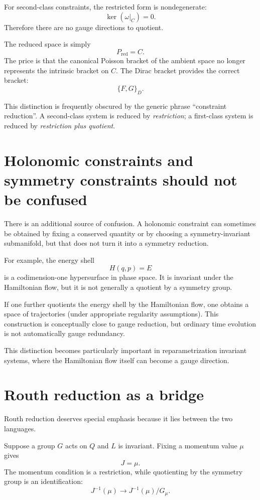 \documentclass[11pt,a4paper]{article}
\theoremstyle{definition}
\begin{document}
For second-class constraints, the restricted form is nondegenerate:
\[
        \ker(\omega|_C)=0.
\]
Therefore there are no gauge directions to quotient.

The reduced space is simply
\[
        P_{\mathrm{red}}=C.
\]
The price is that the canonical Poisson bracket of the ambient space no
longer represents the intrinsic bracket on $C$.  The Dirac bracket provides
the correct bracket:
\[
        \{F,G\}_D.
\]

This distinction is frequently obscured by the generic phrase ``constraint
reduction''.  A second-class system is reduced by \emph{restriction}; a
first-class system is reduced by \emph{restriction plus quotient}.

\section{Holonomic constraints and symmetry constraints should not be confused}

There is an additional source of confusion.  A holonomic constraint can
sometimes be obtained by fixing a conserved quantity or by choosing a
symmetry-invariant submanifold, but that does not turn it into a symmetry
reduction.

For example, the energy shell
\[
        H(q,p)=E
\]
is a codimension-one hypersurface in phase space.  It is invariant under the
Hamiltonian flow, but it is not generally a quotient by a symmetry group.

If one further quotients the energy shell by the Hamiltonian flow, one obtains
a space of trajectories (under appropriate regularity assumptions).  This
construction is conceptually close to gauge reduction, but ordinary time
evolution is not automatically gauge redundancy.

This distinction becomes particularly important in reparametrization
invariant systems, where the Hamiltonian flow itself can become a gauge
direction.

\section{Routh reduction as a bridge}

Routh reduction deserves special emphasis because it lies between the two
languages.

Suppose a group $G$ acts on $Q$ and $L$ is invariant.  Fixing a momentum
value $\mu$ gives
\[
        J=\mu.
\]
The momentum condition is a restriction, while quotienting by the symmetry
group is an identification:
\[
        J^{-1}(\mu)
        \longrightarrow
        J^{-1}(\mu)/G_\mu.
\]
\end{document}
